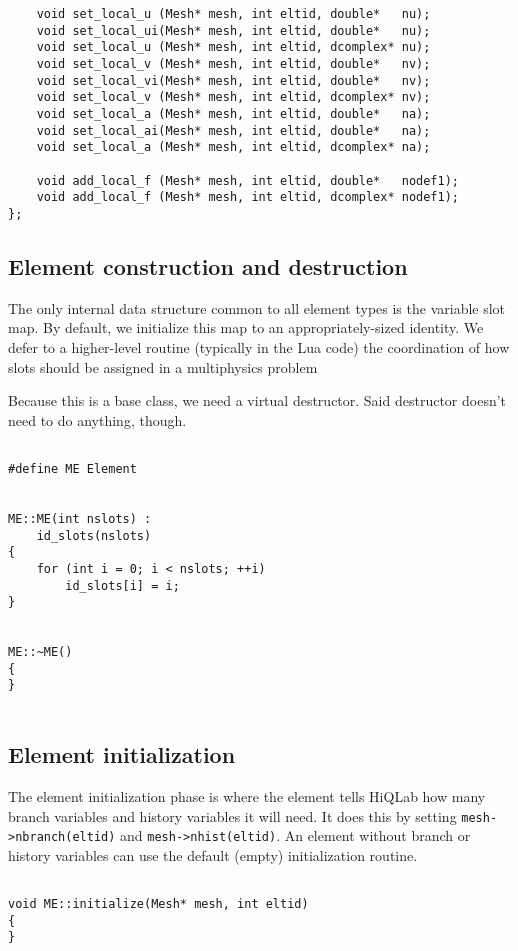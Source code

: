 \begin{verbatim}
    void set_local_u (Mesh* mesh, int eltid, double*   nu);
    void set_local_ui(Mesh* mesh, int eltid, double*   nu);
    void set_local_u (Mesh* mesh, int eltid, dcomplex* nu);
    void set_local_v (Mesh* mesh, int eltid, double*   nv);
    void set_local_vi(Mesh* mesh, int eltid, double*   nv);
    void set_local_v (Mesh* mesh, int eltid, dcomplex* nv);
    void set_local_a (Mesh* mesh, int eltid, double*   na);
    void set_local_ai(Mesh* mesh, int eltid, double*   na);
    void set_local_a (Mesh* mesh, int eltid, dcomplex* na);

    void add_local_f (Mesh* mesh, int eltid, double*   nodef1);
    void add_local_f (Mesh* mesh, int eltid, dcomplex* nodef1);
};

\end{verbatim}
\subsection{Element construction and destruction}

The only internal data structure common to all element types is the
variable slot map.  By default, we initialize this map to an
appropriately-sized identity.  We defer to a higher-level routine
(typically in the Lua code) the coordination of how slots should be
assigned in a multiphysics problem

Because this is a base class, we need a virtual destructor.  Said
destructor doesn't need to do anything, though.

\begin{verbatim}

#define ME Element


ME::ME(int nslots) :
    id_slots(nslots)
{
    for (int i = 0; i < nslots; ++i)
        id_slots[i] = i;
}


ME::~ME()
{
}


\end{verbatim}
\subsection{Element initialization}

The element initialization phase is where the element tells
HiQLab how many branch variables and history variables it will
need.  It does this by setting {\tt mesh->nbranch(eltid)} and
{\tt mesh->nhist(eltid)}.  An element without branch or history
variables can use the default (empty) initialization routine.

\begin{verbatim}

void ME::initialize(Mesh* mesh, int eltid)
{
}


\end{verbatim}
